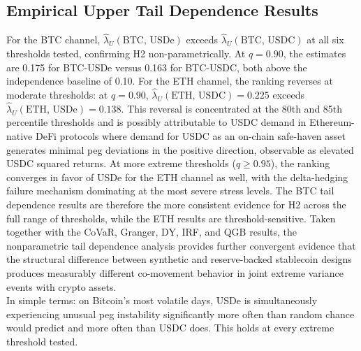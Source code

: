 \documentclass[12pt,a4paper,titlepage,oneside,english]{article}
\begin{document}
\subsection{Empirical Upper Tail Dependence Results}
For the BTC channel, $\hat{\lambda}_U(\text{BTC, USDe})$ exceeds
$\hat{\lambda}_U(\text{BTC, USDC})$ at all six thresholds tested, confirming H2
non-parametrically. At $q = 0.90$, the estimates are 0.175 for BTC-USDe versus
0.163 for BTC-USDC, both above the independence baseline of 0.10. For the ETH
channel, the ranking reverses at moderate thresholds: at $q = 0.90$,
$\hat{\lambda}_U(\text{ETH, USDC}) = 0.225$ exceeds
$\hat{\lambda}_U(\text{ETH, USDe}) = 0.138$. This reversal is concentrated at
the 80th and 85th percentile thresholds and is possibly attributable to USDC demand in Ethereum-native DeFi protocols where demand for USDC as an on-chain safe-haven asset generates minimal peg deviations in the positive direction, observable as elevated USDC squared returns. At more extreme thresholds ($q \geq 0.95$), the ranking converges in favor of USDe for the ETH channel as well, with the delta-hedging failure mechanism dominating at the
most severe stress levels. The BTC tail dependence results are therefore the
more consistent evidence for H2 across the full range of thresholds, while the
ETH results are threshold-sensitive.
Taken together with the CoVaR, Granger, DY, IRF, and QGB results, the
nonparametric tail dependence analysis provides further convergent evidence
that the structural difference between synthetic and reserve-backed stablecoin
designs produces measurably different co-movement behavior in joint extreme
variance events with crypto assets.\\
In simple terms: on Bitcoin's most volatile days, USDe is simultaneously
experiencing unusual peg instability significantly more often than random
chance would predict and more often than USDC does. This holds at every
extreme threshold tested.

\end{document}
